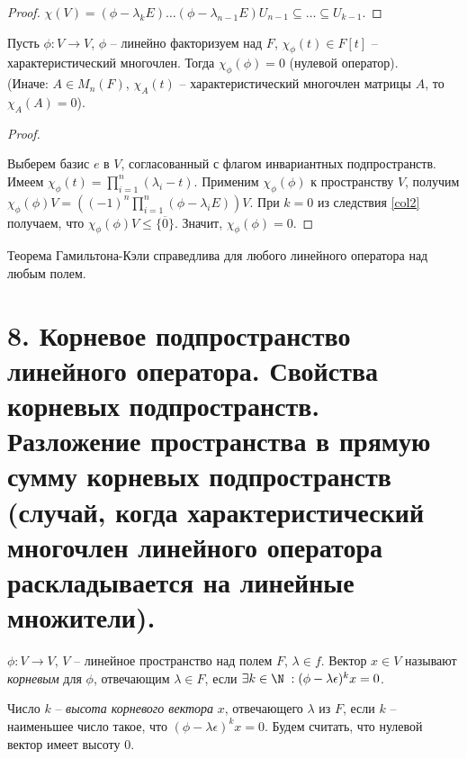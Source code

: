 \begin{proof}
    $\chi(V) = (\phi - \lambda_k E) \dots (\phi - \lambda_{n - 1} E) U_{n - 1} \subseteq \dots \subseteq U_{k - 1}$.
\end{proof}

\begin{theorem}
    \label{th4.4}
    Пусть $\phi: V \to V$, $\phi$ -- линейно факторизуем над $F$, $\chi_{\phi}(t) \in F[t]$ -- характеристический многочлен. Тогда $\chi_{\phi}(\phi) = 0$ (нулевой оператор).\\
    (Иначе: $A \in M_n(F)$, $\chi_A(t)$ -- характеристический многочлен матрицы $A$, то $\chi_A(A) = 0$).
\end{theorem}

\begin{proof}~

    Выберем базис $e$ в $V$, согласованный с флагом инвариантных подпространств. Имеем $\chi_{\phi}(t) = \prod_{i=1}^n (\lambda_i - t)$. Применим $\chi_{\phi}(\phi)$ к пространству $V$, получим $\chi_{\phi}(\phi)V = \left((-1)^n \prod_{i=1}^n (\phi - \lambda_i E)\right)V$. При $k = 0$ из следствия \ref{col2} получаем, что $\chi_{\phi}(\phi)V \leq \{\overline{0}\}$. Значит, $\chi_{\phi}(\phi) = 0$.
\end{proof}

\begin{note}
    Теорема Гамильтона-Кэли справедлива для любого линейного оператора над любым полем.
\end{note}

\section{8. Корневое подпространство линейного оператора. Свойства корневых подпространств. Разложение пространства в прямую сумму корневых подпространств (случай, когда характеристический многочлен линейного оператора раскладывается на линейные множители).}

\begin{definition}
    $\phi : V \to V$, $V$ -- линейное пространство над полем $F$, $\lambda \in f$.
    Вектор $x \in V$ называют \textit{корневым} для $\phi$, отвечающим $\lambda \in F$, если 
    $\exists k \in \N \; : (\phi - \lambda \epsilon)^{k}x = 0$.
\end{definition}

\begin{definition}
    Число $k$ -- \textit{высота корневого вектора} $x$, отвечающего $\lambda$ из $F$, если $k$ -- наименьшее 
    число такое, что $(\phi - \lambda \epsilon)^k x = 0$. 
    Будем считать, что нулевой вектор имеет высоту 0.
\end{definition}

